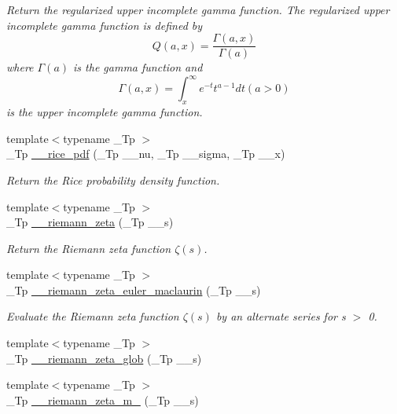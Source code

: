 \begin{DoxyCompactItemize}
\begin{DoxyCompactList}\small\item\em Return the regularized upper incomplete gamma function. The regularized upper incomplete gamma function is defined by \[ Q(a,x) = \frac{\Gamma(a,x)}{\Gamma(a)} \] where $ \Gamma(a) $ is the gamma function and \[ \Gamma(a,x) = \int_x^\infty e^{-t}t^{a-1}dt (a > 0) \] is the upper incomplete gamma function. \end{DoxyCompactList}\item 
{\footnotesize template$<$typename \+\_\+\+Tp $>$ }\\\+\_\+\+Tp \hyperlink{namespacestd_1_1____detail_a571f37fdf793a91985073a58a873e731}{\+\_\+\+\_\+rice\+\_\+pdf} (\+\_\+\+Tp \+\_\+\+\_\+nu, \+\_\+\+Tp \+\_\+\+\_\+sigma, \+\_\+\+Tp \+\_\+\+\_\+x)
\begin{DoxyCompactList}\small\item\em Return the Rice probability density function. \end{DoxyCompactList}\item 
{\footnotesize template$<$typename \+\_\+\+Tp $>$ }\\\+\_\+\+Tp \hyperlink{namespacestd_1_1____detail_a2be77d9bdd1b8b463be44a0e7558bc2a}{\+\_\+\+\_\+riemann\+\_\+zeta} (\+\_\+\+Tp \+\_\+\+\_\+s)
\begin{DoxyCompactList}\small\item\em Return the Riemann zeta function $ \zeta(s) $. \end{DoxyCompactList}\item 
{\footnotesize template$<$typename \+\_\+\+Tp $>$ }\\\+\_\+\+Tp \hyperlink{namespacestd_1_1____detail_a84ac805996c4eeb8cbfa181e6e47f0ae}{\+\_\+\+\_\+riemann\+\_\+zeta\+\_\+euler\+\_\+maclaurin} (\+\_\+\+Tp \+\_\+\+\_\+s)
\begin{DoxyCompactList}\small\item\em Evaluate the Riemann zeta function $ \zeta(s) $ by an alternate series for s $>$ 0. \end{DoxyCompactList}\item 
{\footnotesize template$<$typename \+\_\+\+Tp $>$ }\\\+\_\+\+Tp \hyperlink{namespacestd_1_1____detail_ab3542ea44b34da3d4865ed9a014e2951}{\+\_\+\+\_\+riemann\+\_\+zeta\+\_\+glob} (\+\_\+\+Tp \+\_\+\+\_\+s)
\item 
{\footnotesize template$<$typename \+\_\+\+Tp $>$ }\\\+\_\+\+Tp \hyperlink{namespacestd_1_1____detail_a174bfa28eeb176b90ff251b5affbecb2}{\+\_\+\+\_\+riemann\+\_\+zeta\+\_\+m\+\_} (\+\_\+\+Tp \+\_\+\+\_\+s)

\end{DoxyCompactItemize}
